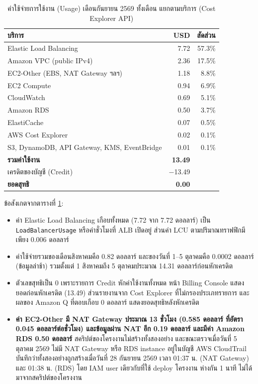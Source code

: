 \begin{table}[H]
\centering
\caption{ค่าใช้จ่ายการใช้งาน (Usage) เดือนกันยายน 2569 ทั้งเดือน แยกตามบริการ (Cost Explorer API)}
\label{tab:billing_full}
\begin{tabularx}{\textwidth}{lrr}
\toprule
\textbf{บริการ} & \textbf{USD} & \textbf{สัดส่วน} \\
\midrule
Elastic Load Balancing & 7.72 & 57.3\% \\
Amazon VPC (public IPv4) & 2.36 & 17.5\% \\
EC2-Other (EBS, NAT Gateway ฯลฯ) & 1.18 & 8.8\% \\
EC2 Compute & 0.94 & 6.9\% \\
CloudWatch & 0.69 & 5.1\% \\
Amazon RDS & 0.50 & 3.7\% \\
ElastiCache & 0.07 & 0.5\% \\
AWS Cost Explorer & 0.02 & 0.1\% \\
S3, DynamoDB, API Gateway, KMS, EventBridge & 0.01 & 0.1\% \\
\midrule
\textbf{รวมค่าใช้งาน} & \textbf{13.49} & \\
เครดิตของบัญชี (Credit) & $-$13.49 & \\
\textbf{ยอดสุทธิ} & \textbf{0.00} & \\
\bottomrule
\end{tabularx}
\end{table}

ข้อสังเกตจากตารางที่ \ref{tab:billing_full}:
\begin{itemize}
    \item ค่า Elastic Load Balancing เกือบทั้งหมด (7.72 จาก 7.72 ดอลลาร์) เป็น \texttt{LoadBalancerUsage} หรือค่าชั่วโมงที่ ALB เปิดอยู่ ส่วนค่า LCU ตามปริมาณทราฟฟิกมีเพียง 0.006 ดอลลาร์
    \item ค่าใช้จ่ายรวมของเดือนสิงหาคมคือ 0.82 ดอลลาร์ และของวันที่ 1--5 ตุลาคมคือ 0.0002 ดอลลาร์ (ข้อมูลล่าช้า) รวมตั้งแต่ 1 สิงหาคมถึง 5 ตุลาคมประมาณ 14.31 ดอลลาร์ก่อนหักเครดิต
    \item ตัวเลขสุทธิเป็น 0 เพราะรายการ Credit หักค่าใช้งานทั้งหมด หน้า Billing Console แสดงยอดก่อนหักเครดิต (13.49) ส่วนรายงานจาก Cost Explorer ที่ไม่กรองประเภทรายการ และผลของ Amazon Q ที่ตอบเกือบ 0 ดอลลาร์ แสดงยอดสุทธิหลังหักเครดิต
    \item \textbf{ค่า EC2-Other มี NAT Gateway ประมาณ 13 ชั่วโมง (0.585 ดอลลาร์ ที่อัตรา 0.045 ดอลลาร์ต่อชั่วโมง) และข้อมูลผ่าน NAT อีก 0.19 ดอลลาร์ และมีค่า Amazon RDS 0.50 ดอลลาร์} สคริปต์ของโครงงานไม่สร้างทั้งสองอย่าง และขณะตรวจเมื่อวันที่ 5 ตุลาคม 2569 ไม่มี NAT Gateway หรือ RDS instance อยู่ในบัญชี AWS CloudTrail บันทึกว่าทั้งสองอย่างถูกสร้างเมื่อวันที่ 28 กันยายน 2569 เวลา 01:37 น. (NAT Gateway) และ 01:38 น. (RDS) โดย IAM user เดียวกับที่ใช้ deploy โครงงาน ห่างกัน 1 นาที ไม่ได้มาจากสคริปต์ของโครงงาน 
\end{itemize}
